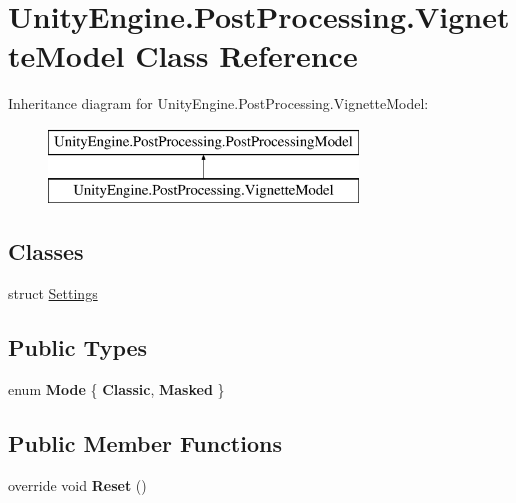 \hypertarget{class_unity_engine_1_1_post_processing_1_1_vignette_model}{}\section{Unity\+Engine.\+Post\+Processing.\+Vignette\+Model Class Reference}
\label{class_unity_engine_1_1_post_processing_1_1_vignette_model}
Inheritance diagram for Unity\+Engine.\+Post\+Processing.\+Vignette\+Model\+:\begin{figure}[H]
\begin{center}
\leavevmode
\includegraphics[height=2.000000cm]{class_unity_engine_1_1_post_processing_1_1_vignette_model}
\end{center}
\end{figure}
\subsection*{Classes}
\begin{DoxyCompactItemize}
\item 
struct \hyperlink{struct_unity_engine_1_1_post_processing_1_1_vignette_model_1_1_settings}{Settings}
\end{DoxyCompactItemize}
\subsection*{Public Types}
\begin{DoxyCompactItemize}
\item 
\mbox{\label{class_unity_engine_1_1_post_processing_1_1_vignette_model_a98eb04307bcb3c902a1189d324a2f53d}} 
enum {\bfseries Mode} \{ {\bfseries Classic}, 
{\bfseries Masked}
 \}
\end{DoxyCompactItemize}
\subsection*{Public Member Functions}
\begin{DoxyCompactItemize}
\item 
\mbox{\label{class_unity_engine_1_1_post_processing_1_1_vignette_model_a7598645b887ddf177a33787cd06ca751}} 
override void {\bfseries Reset} ()
\end{DoxyCompactItemize}
